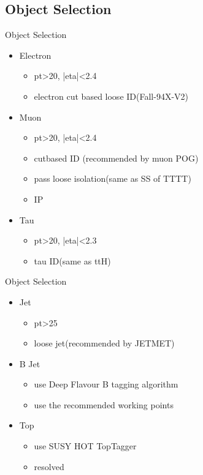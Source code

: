 \documentclass{beamer}
\begin{document}
\subsection{Object Selection}


\begin{frame}{Object Selection}
  \begin{itemize}
  \item
    Electron 
    \begin{itemize}
    \item
        pt>20, |eta|<2.4
    \item
        electron cut based loose ID(Fall-94X-V2)
    \end{itemize}
  \item
    Muon
    \begin{itemize}
    \item
        pt>20, |eta|<2.4
    \item
        cutbased ID (recommended by muon POG)
    \item
        pass loose isolation(same as SS of TTTT)
    \item
        IP
    \end{itemize}
  \item
    Tau
    \begin{itemize}
    \item
        pt>20, |eta|<2.3
    \item
        tau ID(same as ttH)
    \end{itemize}
  \end{itemize}
\end{frame}


\begin{frame}{Object Selection}
  \begin{itemize}
  \item
    Jet
    \begin{itemize}
    \item
        pt>25
    \item
        loose jet(recommended by JETMET)
    \end{itemize}
  \item
     B Jet
     \begin{itemize}
        \item
            use Deep Flavour B tagging algorithm 
        \item 
            use the recommended working points
     \end{itemize}
  \item
      Top 
    \begin{itemize}
    \item
        use SUSY HOT TopTagger 
    \item 
        resolved
    \end{itemize}

  \end{itemize}
\end{frame}
\end{document}
